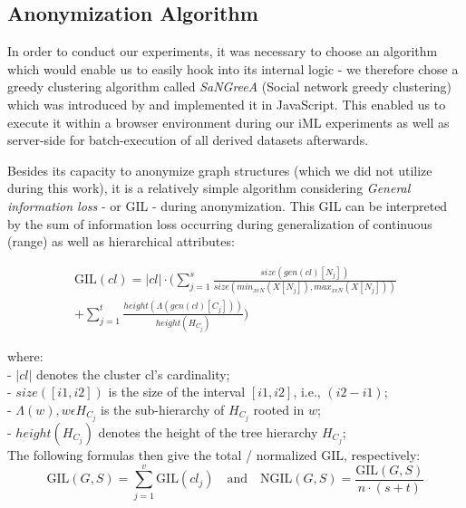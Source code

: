 \documentclass{llncs}
\providecommand{\abs}[1]{\lvert#1\rvert}
\begin{document}
\subsection{Anonymization Algorithm}
\label{ssect:algorithm}

In order to conduct our experiments, it was necessary to choose an algorithm which would enable us to easily hook into its internal logic - we therefore chose a greedy clustering algorithm called \textit{SaNGreeA} (Social network greedy clustering) which was introduced by \cite{campan2009data} and implemented it in JavaScript. This enabled us to execute it within a browser environment during our iML experiments as well as server-side for batch-execution of all derived datasets afterwards.

Besides its capacity to anonymize graph structures (which we did not utilize during this work), it is a relatively simple algorithm considering \textit{General information loss} - or GIL - during anonymization. This GIL can be interpreted by the sum of information loss occurring during generalization of continuous (range) as well as hierarchical attributes:

\begin{equation*}
\begin{split}
\text{GIL}(cl) = \abs{cl} \cdot (\sum_{j=1}^{s} \frac{size(gen(cl)[N_j])}{size(min_{x \epsilon N} (X[N_j]), max_{x \epsilon N} (X[N_j]))} \\
+ \sum_{j=1}^{t} \frac{height(\Lambda(gen(cl)[C_j]))}{height(H_{C_j})})
\end{split}
\end{equation*}


where:\\
- $\abs{cl}$ denotes the cluster cl's cardinality; \\
- $size([i1,i2])$ is the size of the interval $[i1,i2]$, i.e., $(i2-i1)$; \\
- $\Lambda(w), w \epsilon H_{C_j}$ is the sub-hierarchy of $H_{C_j}$ rooted in $w$; \\
- $height(H_{C_j})$ denotes the height of the tree hierarchy $H_{C_j}$; \\


The following formulas then give the total / normalized GIL, respectively:
\begin{equation*}
\text{GIL}(G,S) = \sum_{j=1}^{v} \text{GIL}(cl_j) \quad \textrm{and} \quad
\text{NGIL}(G,S) = \frac{\text{GIL}(G,S)}{n \cdot (s+t)}
\end{equation*}
\end{document}
